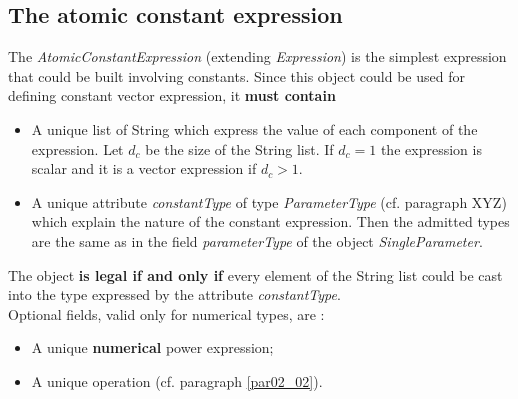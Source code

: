 \documentclass[11pt]{amsart}
\begin{document}
\subsection{The atomic constant expression}\label{par02_03}
The {\it AtomicConstantExpression} (extending {\it Expression}) is the simplest expression that could be built involving constants. Since this object could be used for defining constant vector expression, it {\bf must contain} 
\begin{itemize}
\item A unique list of String which express the value of each component of the expression. Let $d_c$ be the size of the String list. If $d_c=1$ the expression is scalar and it is a vector expression if $d_c>1$. 
\item A unique attribute {\it constantType} of type {\it ParameterType} (cf. paragraph XYZ) which explain the nature of the constant expression. Then the admitted types are the same as in the field {\it parameterType} of the object {\it SingleParameter}. 
\end{itemize}
The object {\bf is legal if and only if} every element of the String list could be cast into the type expressed by the attribute {\it constantType}.\\

Optional fields, valid only for numerical types, are : 
\begin{itemize}
\item A unique {\bf numerical} power expression;
\item A unique operation (cf. paragraph \ref{par02_02}).
\end{itemize}
\end{document}
